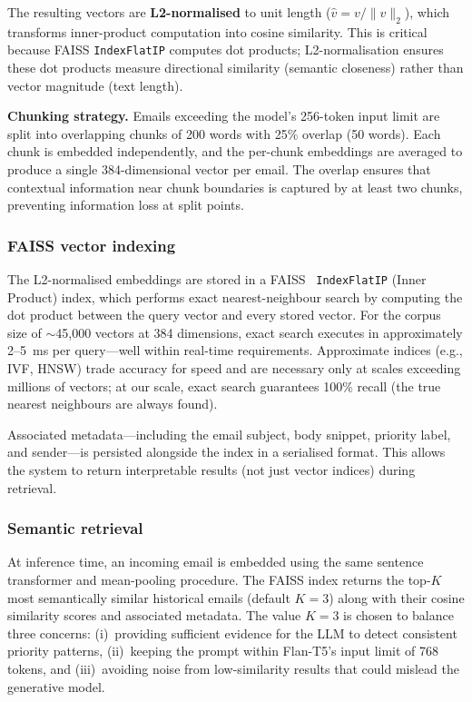 \documentclass[3p,times,procedia]{elsarticle}
\begin{document}
The resulting vectors are \textbf{L2-normalised} to unit length ($\hat{v} = v / \|v\|_2$), which transforms inner-product computation into cosine similarity. This is critical because FAISS \texttt{IndexFlatIP} computes dot products; L2-normalisation ensures these dot products measure directional similarity (semantic closeness) rather than vector magnitude (text length).

\textbf{Chunking strategy.} Emails exceeding the model's 256-token input limit are split into overlapping chunks of 200 words with 25\% overlap (50 words). Each chunk is embedded independently, and the per-chunk embeddings are averaged to produce a single 384-dimensional vector per email. The overlap ensures that contextual information near chunk boundaries is captured by at least two chunks, preventing information loss at split points.

\subsubsection{FAISS vector indexing}

The L2-normalised embeddings are stored in a FAISS~\cite{johnson2019} \texttt{IndexFlatIP} (Inner Product) index, which performs exact nearest-neighbour search by computing the dot product between the query vector and every stored vector. For the corpus size of $\sim$45,000 vectors at 384 dimensions, exact search executes in approximately 2--5~ms per query---well within real-time requirements. Approximate indices (e.g., IVF, HNSW) trade accuracy for speed and are necessary only at scales exceeding millions of vectors; at our scale, exact search guarantees 100\% recall (the true nearest neighbours are always found).

Associated metadata---including the email subject, body snippet, priority label, and sender---is persisted alongside the index in a serialised format. This allows the system to return interpretable results (not just vector indices) during retrieval.

\subsubsection{Semantic retrieval}

At inference time, an incoming email is embedded using the same sentence transformer and mean-pooling procedure. The FAISS index returns the top-$K$ most semantically similar historical emails (default $K = 3$) along with their cosine similarity scores and associated metadata. The value $K = 3$ is chosen to balance three concerns: (i)~providing sufficient evidence for the LLM to detect consistent priority patterns, (ii)~keeping the prompt within Flan-T5's input limit of 768 tokens, and (iii)~avoiding noise from low-similarity results that could mislead the generative model.
\end{document}
